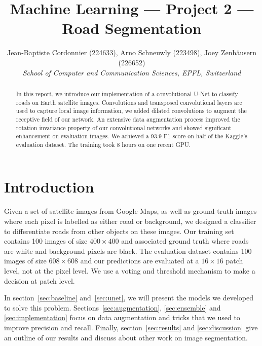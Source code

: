 \documentclass[10pt,conference,compsocconf]{IEEEtran}
\begin{document}
\title{Machine Learning --- Project 2 --- Road Segmentation}

\author{
  Jean-Baptiste Cordonnier (224633), Arno Schneuwly (223498), Joey Zenhäusern (226652)\\
  \textit{School of Computer and Communication Sciences, EPFL, Switzerland}
}

\maketitle

\begin{abstract}
  In this report, we introduce our implementation of a convolutional U-Net to classify roads on Earth satellite images. Convolutions and transposed convolutional layers are used to capture local image information, we added dilated convolutions to augment the receptive field of our network. An extensive data augmentation process improved the rotation invariance property of our convolutional networks and showed significant enhancement on evaluation images. We achieved a 93.9 F1 score on half of the Kaggle's evaluation dataset. The training took 8 hours on one recent GPU.
\end{abstract}

\section{Introduction}

Given a set of satellite images from Google Maps, as well as ground-truth images where each pixel is labelled as either road or background, we designed a classifier to differentiate roads from other objects on these images. Our training set contains 100 images of size $400\times400$ and associated ground truth where roads are white and background pixels are black. The evaluation dataset contains 100 images of size $608\times608$ and our predictions are evaluated at a $16\times16$ patch level, not at the pixel level. We use a voting and threshold mechanism to make a decision at patch level.

In section~\ref{sec:baseline} and~\ref{sec:unet}, we will present the models we developed to solve this problem. Sections~\ref{sec:augmentation}, \ref{sec:ensemble} and \ref{sec:implementation} focus on data augmentation and tricks that we used to improve precision and recall. Finally, section~\ref{sec:results} and \ref{sec:discussion} give an outline of our results and discuss about other work on image segmentation.
\end{document}
